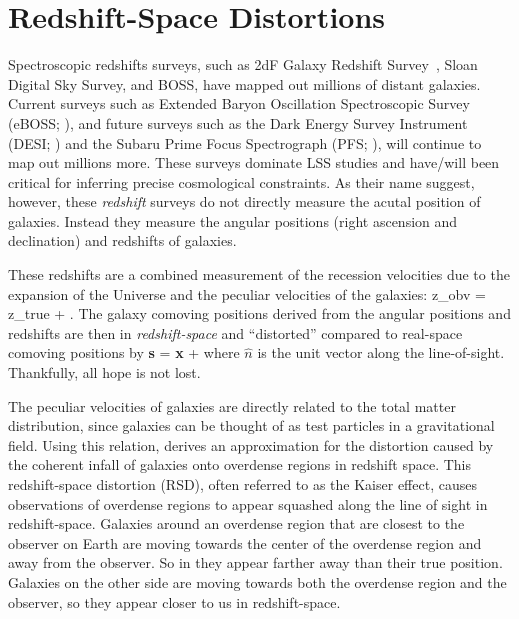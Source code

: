 \section{Redshift-Space Distortions} \label{sec:rsd}
Spectroscopic redshifts surveys, such as 2dF Galaxy Redshift Survey~\citep{Colless:1999aa}, 
Sloan Digital Sky Survey, and BOSS, have mapped out millions of distant galaxies. 
Current surveys such as Extended Baryon Oscillation 
Spectroscopic Survey (eBOSS; \citealt{Dawson:2015aa}), and future surveys such as 
the Dark Energy Survey Instrument (DESI; \citealt{Schlegel:2011aa, Morales:2012aa, Makarem:2014aa}) 
and the Subaru Prime Focus Spectrograph (PFS; \citealt{Takada:2014aa}), will 
continue to map out millions more. These surveys dominate LSS studies and have/will 
been critical for inferring precise cosmological constraints. As their name suggest, 
however, these {\em redshift} surveys do not directly measure the acutal position of 
galaxies. Instead they measure the angular positions (right ascension and declination) 
and redshifts of galaxies. 

These redshifts are a combined measurement of the recession velocities due to 
the expansion of the Universe and the peculiar velocities of the galaxies:
\beq
z_{obv} = z_{true} +  .
\eeq 
The galaxy comoving positions derived from the angular positions and redshifts are then
in {\em redshift-space} and ``distorted'' compared to real-space comoving positions by 
\beq
{\bf s} = {\bf x} +  
\eeq 
where $\hat{n}$ is the unit vector along the line-of-sight. Thankfully, all hope is not 
lost. 

The peculiar velocities of galaxies are directly related to the total 
matter distribution, since galaxies can be thought of as test particles in a 
gravitational field. Using this relation, \cite{Kaiser:1984aa} derives an 
approximation for the distortion caused by the coherent infall of galaxies 
onto overdense regions in redshift space. This redshift-space 
distortion (RSD), often referred to as the Kaiser effect, causes observations of 
overdense regions
to appear squashed along the line of sight in redshift-space. Galaxies around an
overdense region that are closest to the observer on Earth are moving towards the center of the 
overdense region and away from the observer. So in they appear farther away than 
their true position. Galaxies on the other side are moving towards both the overdense 
region and the observer, so they appear closer to us in redshift-space. 

